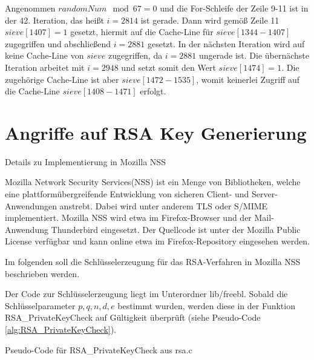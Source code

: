 Angenommen $randomNum \mod 67 = 0$ und die For-Schleife der Zeile 9-11 ist in der 42. Iteration, das heißt $i=2814$ ist gerade.
Dann wird gemöß Zeile 11 $sieve[1407] = 1$ gesetzt, hiermit auf die Cache-Line für $sieve[1344-1407]$ zugegriffen und abschließend $i=2881$ gesetzt.
In der nächsten Iteration wird auf keine Cache-Line von $sieve$ zugegriffen, da $i=2881$ ungerade ist.
Die übernächste Iteration arbeitet mit $i=2948$ und setzt somit den Wert $sieve[1474] = 1$.
Die zugehörige Cache-Line ist aber $sieve[1472-1535]$, womit keinerlei Zugriff auf die Cache-Line $sieve[1408-1471]$ erfolgt.

\section{Angriffe auf RSA Key Generierung}
\label{RSAGenGCDAttack}

Details zu Implementierung in Mozilla NSS

Mozilla Network Security Services(NSS) ist ein Menge von Bibliotheken, welche eine plattformübergreifende Entwicklung von sicheren Client- und Server-Anwendungen anstrebt. Dabei wird unter anderem TLS oder S/MIME implementiert. Mozilla NSS wird etwa im Firefox-Browser und der Mail-Anwendung Thunderbird eingesetzt.
Der Quellcode ist unter der Mozilla Public License verfügbar und kann online etwa im Firefox-Repository \cite{MozillaDXR} eingesehen werden.

Im folgenden soll die Schlüsselerzeugung für das RSA-Verfahren in Mozilla NSS beschrieben werden.

Der Code zur Schlüsselerzeugung liegt im Unterordner lib/freebl. Sobald die Schlüsselparameter $p,q,n,d,e$ bestimmt wurden, werden diese in der Funktion RSA_PrivateKeyCheck auf Gültigkeit überprüft (siehe Pseudo-Code \ref{alg:RSA_PrivateKeyCheck}).

\begin{algorithm}[h]
\DontPrintSemicolon
\caption{Pseudo-Code für RSA_PrivateKeyCheck aus rsa.c}
\label{alg:RSA_PrivateKeyCheck}

\end{algorithm}


